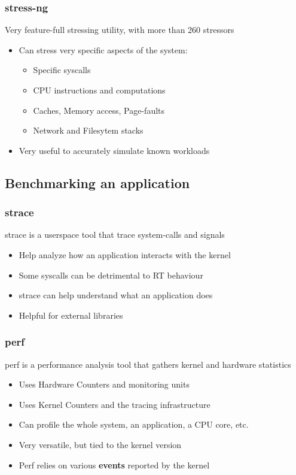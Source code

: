 \begin{frame}
	\frametitle{stress-ng}
	Very feature-full stressing utility, with more than 260 stressors
	\begin{itemize}
		\item Can stress very specific aspects of the system:
			\begin{itemize}
				\item Specific syscalls
				\item CPU instructions and computations
				\item Caches, Memory access, Page-faults
				\item Network and Filesytem stacks
			\end{itemize}
		\item Very useful to accurately simulate known workloads
	\end{itemize}
\end{frame}

\subsection{Benchmarking an application}
\begin{frame}
	\frametitle{strace}
	strace is a userspace tool that trace system-calls and signals
	\begin{itemize}
		\item Help analyze how an application interacts with the kernel
		\item Some syscalls can be detrimental to RT behaviour
		\item strace can help understand what an application does
		\item Helpful for external libraries
	\end{itemize}
\end{frame}

\begin{frame}
	\frametitle{perf}
	perf is a performance analysis tool that gathers kernel and hardware statistics
	\begin{itemize}
		\item Uses Hardware Counters and monitoring units
		\item Uses Kernel Counters and the tracing infrastructure
		\item Can profile the whole system, an application, a CPU core, etc.
		\item Very versatile, but tied to the kernel version
		\item Perf relies on various \textbf{events} reported by the kernel
	\end{itemize}
\end{frame}

